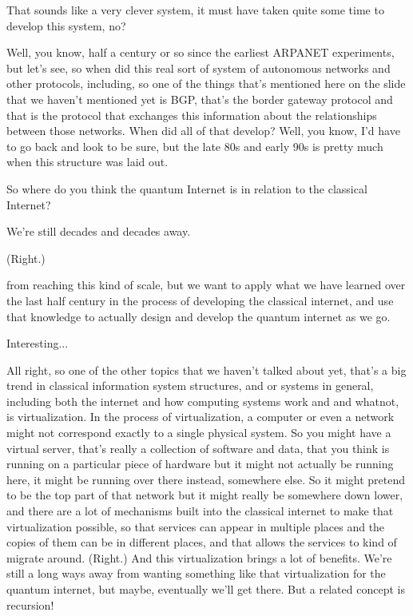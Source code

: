 \mmm That sounds like a very clever system, it must have taken quite some time to develop this system, no?

\rrr Well, you know, half a century or so since the earliest ARPANET experiments, but let's see, so when did this real sort of system of autonomous networks and other protocols, including, so one of the things that's mentioned here on the slide that we haven't mentioned yet is BGP, that's the border gateway protocol and that is the protocol that exchanges this information about the relationships between those networks. When did all of that develop? Well, you know, I'd have to go back and look to be sure, but the late 80s and early 90s is pretty much when this structure was laid out.

\mmm So where do you think the quantum Internet is in relation to the classical Internet?

\rrr We're still decades and decades away.

\mmm (Right.) 

\rrr from reaching this kind of scale, but we want to apply what we have learned over the last half century in the process of developing the classical internet, and use that knowledge to actually design and develop the quantum internet as we go.

\mmm Interesting...

\rrr All right, so one of the other topics that we haven't talked about yet, that's a big trend in classical information system structures, and or systems in general, including both the internet and how computing systems work and and whatnot, is virtualization. In the process of virtualization, a computer or even a network might not correspond exactly to a single physical system. So you might have a virtual server, that's really a collection of software and data, that you think is running on a particular piece of hardware but it might not actually be running here, it might be running over there instead, somewhere else. So it might pretend to be the top part of that network but it might really be somewhere down lower, and there are a lot of mechanisms built into the classical internet to make that virtualization possible, so that services can appear in multiple places and the copies of them can be in different places, and that allows the services to kind of migrate around. (Right.) And this virtualization brings a lot of benefits. We're still a long ways away from wanting something like that virtualization for the quantum internet, but maybe, eventually we'll get there. But a related concept is recursion!



